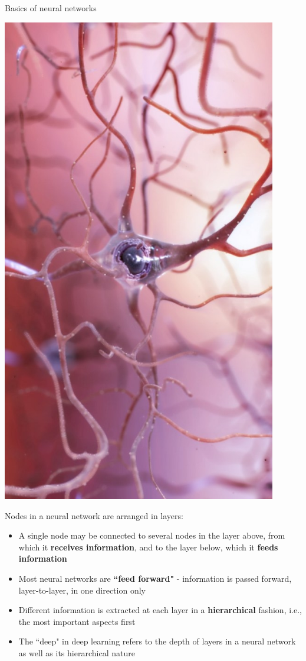 \documentclass{beamer}
\begin{document}
\begin{frame}{Basics of neural networks}
\begin{minipage}{0.29\linewidth}
\includegraphics[width=0.9\textwidth]{Images/neuron.jpg}
\end{minipage}
\end{frame}
\begin{frame}
 Nodes in a neural network are arranged in layers:
\begin{itemize}
\item A single node may be connected to several nodes in the layer above, from which it \textbf{receives information}, and to the layer below, which it \textbf{feeds information}
\item Most neural networks are \textbf{``feed forward"} - information is passed forward, layer-to-layer, in one direction only
\item Different information is extracted at each layer in a \textbf{hierarchical} fashion, i.e., the most important aspects first
\item The ``deep" in deep learning refers to the depth of layers in a neural network as well as its hierarchical nature
\end{itemize}
\end{frame}
\end{document}
